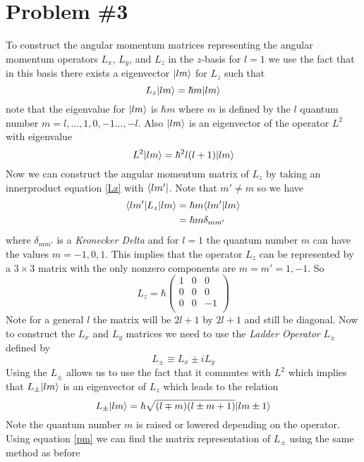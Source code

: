 \documentclass[11pt]{article}
\numberwithin{equation}{section}
\begin{document}
\section{Problem \#3}
To construct the angular momentum matrices representing the angular momentum operators $L_x$, $L_y$, and $L_z$ in the $z$-basis for $l=1$ we use the fact that in this basis there exists a eigenvector $|{lm}\rangle$ for $L_z$ such that
\begin{equation}
L_z|{lm}\rangle = \hbar m|{lm}\rangle
\label{Lz}
\end{equation}
note that the eigenvalue for $|{lm}\rangle$ is $\hbar m$ where $m$ is defined by the $l$ quantum number $m = l,...,1,0,-1...,-l$. Also $|{lm}\rangle$ is an eigenvector of the operator $L^2$ with eigenvalue
\begin{equation}
L^2|{lm}\rangle = \hbar^2 l(l+1)|{lm}\rangle
\end{equation}
Now we can construct the angular momentum matrix of $L_z$ by taking an innerproduct equation \ref{Lz} with $\langle{lm'}|$. Note that $m'\ne m$ so we have
\begin{align*}
\langle{lm'}|L_z|{lm}\rangle &= \hbar m\langle{lm'}|{lm}\rangle\\
&= \hbar m\delta_{mm'}
\end{align*}
where $\delta_{mm'}$ is a \emph{Kronecker Delta} and for $l=1$ the quantum number $m$ can have the values $m = -1,0,1$. This implies that the operator $L_z$ can be represented by a $3\times3$ matrix with the only nonzero components are $m=m'=1,-1$. So
$$L_z = \hbar\left(\begin{array}{ccc}
        1   &0   &0\\
        0   &0   &0\\
        0   &0   &-1\\
        \end{array}\right)$$
Note for a general $l$ the matrix will be $2l+1$ by $2l+1$ and still be diagonal. Now to construct the $L_x$ and $L_y$ matrices we need to use the \emph{Ladder Operator} $L_{\pm}$ defined by
\begin{equation}
L_{\pm}\equiv L_x\pm iL_y
\end{equation}
Using the $L_{\pm}$ allows us to use the fact that it commutes with $L^2$ which implies that $L_{\pm}|{lm}\rangle$ is an eigenvector of $L_z$ which leads to the relation
\begin{equation}
L_{\pm}|{lm}\rangle = \hbar\sqrt{(l\mp m)(l\pm m+1)}|{lm\pm1}\rangle
\label{pm}
\end{equation}
Note the quantum number $m$ is raised or lowered depending on the operator. Using equation \ref{pm} we can find the matrix representation of $L_{\pm}$ using the same method as before
\end{document}

